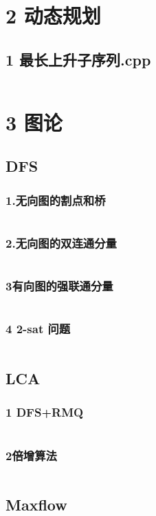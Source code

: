 \documentclass{article}
\begin{document}
\section{2 动态规划}
\subsection{1 最长上升子序列.cpp}
\inputminted{c++}{/home/zzuzxy/t2/Template1.0/2 动态规划/1 最长上升子序列.cpp}
\section{3 图论}
\subsection{DFS}
\subsubsection{1.无向图的割点和桥}
\inputminted{c++}{/home/zzuzxy/t2/Template1.0/3 图论/DFS/1.无向图的割点和桥.cpp}
\subsubsection{2.无向图的双连通分量}
\inputminted{c++}{/home/zzuzxy/t2/Template1.0/3 图论/DFS/2.无向图的双连通分量.cpp}
\subsubsection{3有向图的强联通分量}
\inputminted{c++}{/home/zzuzxy/t2/Template1.0/3 图论/DFS/3有向图的强联通分量.cpp}
\subsubsection{4 2-sat 问题}
\inputminted{c++}{/home/zzuzxy/t2/Template1.0/3 图论/DFS/4 2-sat 问题.cpp}
\subsection{LCA}
\subsubsection{1 DFS+RMQ}
\inputminted{c++}{/home/zzuzxy/t2/Template1.0/3 图论/LCA/1 DFS+RMQ.cpp}
\subsubsection{2倍增算法}
\inputminted{c++}{/home/zzuzxy/t2/Template1.0/3 图论/LCA/2倍增算法.cpp}
\subsection{Maxflow}
\end{document}
